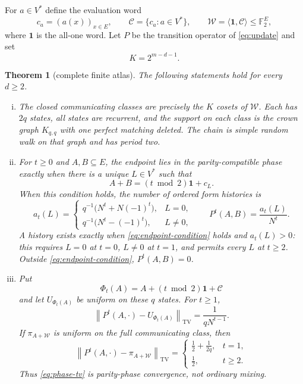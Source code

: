\documentclass[a4paper,10pt]{amsart}
\newtheorem{theorem}{Theorem}
\theoremstyle{remark}
\newcommand{\F}{\mathbb F}
\newcommand{\one}{\mathbf 1}
\newcommand{\cC}{\mathcal C}
\newcommand{\cW}{\mathcal W}
\newcommand{\TV}{\mathrm{TV}}
\begin{document}
For $a\in V^*$ define the evaluation word
\begin{equation}\label{eq:code}
 c_a=(a(x))_{x\in E},\qquad
 \cC=\{c_a:a\in V^*\},\qquad
 \cW=\langle\one,\cC\rangle\le \F_2^E,
\end{equation}
where $\one$ is the all-one word.  Let $P$ be the transition operator of
\eqref{eq:update} and set
\begin{equation}\label{eq:K}
                  K=2^{m-d-1}.
\end{equation}

\begin{theorem}[complete finite atlas]\label{thm:main}
The following statements hold for every $d\ge2$.
\begin{enumerate}[(i)]
\item The closed communicating classes are precisely the $K$ cosets of
$\cW$.  Each has $2q$ states, all states are recurrent, and the support on
each class is the crown graph $K_{q,q}$ with one perfect matching deleted.
The chain is simple random walk on that graph and has period two.

\item For $t\ge0$ and $A,B\subseteq E$, the endpoint lies in the
parity-compatible phase exactly when there is a unique $L\in V^*$ such that
\begin{equation}\label{eq:endpoint-condition}
             A+B=(t\bmod2)\one+c_L.
\end{equation}
When this condition holds, the number of ordered form histories is
\begin{equation}\label{eq:history-count}
 a_t(L)=\begin{cases}
 q^{-1}\bigl(N^t+N(-1)^t\bigr),&L=0,\\
 q^{-1}\bigl(N^t-(-1)^t\bigr),&L\ne0,
 \end{cases}
 \qquad P^t(A,B)=\dfrac{a_t(L)}{N^t}.
\end{equation}
A history exists exactly when \eqref{eq:endpoint-condition} holds and
$a_t(L)>0$: this requires $L=0$ at $t=0$, $L\ne0$ at $t=1$, and permits
every $L$ at $t\ge2$.  Outside \eqref{eq:endpoint-condition},
$P^t(A,B)=0$.

\item Put
\begin{equation}\label{eq:phase}
 \Phi_t(A)=A+(t\bmod2)\one+\cC
\end{equation}
and let $U_{\Phi_t(A)}$ be uniform on these $q$ states.  For $t\ge1$,
\begin{equation}\label{eq:phase-tv}
 \left\|P^t(A,\cdot)-U_{\Phi_t(A)}\right\|_{\TV}
       =\frac{1}{qN^{t-1}}.
\end{equation}
If $\pi_{A+\cW}$ is uniform on the full communicating class, then
\begin{equation}\label{eq:ordinary-tv}
 \left\|P^t(A,\cdot)-\pi_{A+\cW}\right\|_{\TV}
 =\begin{cases}
 \frac12+\frac{1}{2q},&t=1,\\[1mm]
 \frac12,&t\ge2.
 \end{cases}
\end{equation}
Thus \eqref{eq:phase-tv} is parity-phase convergence, not ordinary mixing.


\end{enumerate}
\end{theorem}
\end{document}
